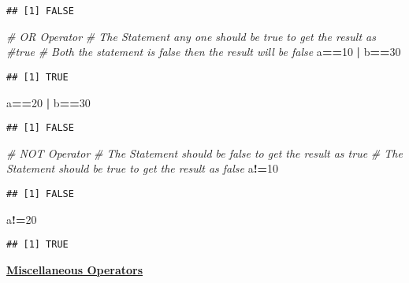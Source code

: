 \documentclass[
]{article}
\newenvironment{Shaded}{\begin{snugshade}}{\end{snugshade}}
\newcommand{\CommentTok}[1]{\textcolor[rgb]{0.56,0.35,0.01}{\textit{#1}}}
\newcommand{\DecValTok}[1]{\textcolor[rgb]{0.00,0.00,0.81}{#1}}
\newcommand{\NormalTok}[1]{#1}
\newcommand{\SpecialCharTok}[1]{\textcolor[rgb]{0.81,0.36,0.00}{\textbf{#1}}}
\begin{document}
\begin{verbatim}
## [1] FALSE
\end{verbatim}

\begin{Shaded}
\begin{Highlighting}[]
\CommentTok{\# OR Operator}
\CommentTok{\# The Statement any one should be true to get the result as \#true}
\CommentTok{\# Both the statement is false then the result will be false}
\NormalTok{a}\SpecialCharTok{==}\DecValTok{10} \SpecialCharTok{|}\NormalTok{ b}\SpecialCharTok{==}\DecValTok{30}
\end{Highlighting}
\end{Shaded}

\begin{verbatim}
## [1] TRUE
\end{verbatim}

\begin{Shaded}
\begin{Highlighting}[]
\NormalTok{a}\SpecialCharTok{==}\DecValTok{20} \SpecialCharTok{|}\NormalTok{ b}\SpecialCharTok{==}\DecValTok{30}
\end{Highlighting}
\end{Shaded}

\begin{verbatim}
## [1] FALSE
\end{verbatim}

\begin{Shaded}
\begin{Highlighting}[]
\CommentTok{\# NOT Operator}
\CommentTok{\# The Statement should be false to get the result as true}
\CommentTok{\# The Statement should be true to get the result as false}
\NormalTok{a}\SpecialCharTok{!=}\DecValTok{10}
\end{Highlighting}
\end{Shaded}

\begin{verbatim}
## [1] FALSE
\end{verbatim}

\begin{Shaded}
\begin{Highlighting}[]
\NormalTok{a}\SpecialCharTok{!=}\DecValTok{20}
\end{Highlighting}
\end{Shaded}

\begin{verbatim}
## [1] TRUE
\end{verbatim}

\ul{\textbf{Miscellaneous Operators}}
\end{document}
